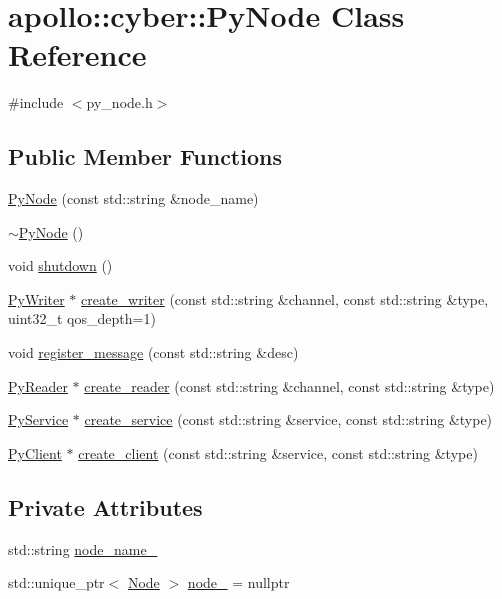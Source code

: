 \hypertarget{classapollo_1_1cyber_1_1PyNode}{\section{apollo\-:\-:cyber\-:\-:Py\-Node Class Reference}
\label{classapollo_1_1cyber_1_1PyNode}
}


{\ttfamily \#include $<$py\-\_\-node.\-h$>$}

\subsection*{Public Member Functions}
\begin{DoxyCompactItemize}
\item 
\hyperlink{classapollo_1_1cyber_1_1PyNode_a1fd745580dbd3402c16e2e5741057583}{Py\-Node} (const std\-::string \&node\-\_\-name)
\item 
\hyperlink{classapollo_1_1cyber_1_1PyNode_a72ef7b8357f4744c0fd5f5bd13c143f6}{$\sim$\-Py\-Node} ()
\item 
void \hyperlink{classapollo_1_1cyber_1_1PyNode_a5b9bca8bb275c76086e21113c829194e}{shutdown} ()
\item 
\hyperlink{classapollo_1_1cyber_1_1PyWriter}{Py\-Writer} $\ast$ \hyperlink{classapollo_1_1cyber_1_1PyNode_a3bcbe1170b63bb7552119540b793675c}{create\-\_\-writer} (const std\-::string \&channel, const std\-::string \&type, uint32\-\_\-t qos\-\_\-depth=1)
\item 
void \hyperlink{classapollo_1_1cyber_1_1PyNode_adb37cff1b766781878d43d4caf7fe183}{register\-\_\-message} (const std\-::string \&desc)
\item 
\hyperlink{classapollo_1_1cyber_1_1PyReader}{Py\-Reader} $\ast$ \hyperlink{classapollo_1_1cyber_1_1PyNode_a51040dbfb514b3758576677cdab32a01}{create\-\_\-reader} (const std\-::string \&channel, const std\-::string \&type)
\item 
\hyperlink{classapollo_1_1cyber_1_1PyService}{Py\-Service} $\ast$ \hyperlink{classapollo_1_1cyber_1_1PyNode_a045d1b609d47c236be36617cc033067b}{create\-\_\-service} (const std\-::string \&service, const std\-::string \&type)
\item 
\hyperlink{classapollo_1_1cyber_1_1PyClient}{Py\-Client} $\ast$ \hyperlink{classapollo_1_1cyber_1_1PyNode_a6e6275ce1059d4b6868be9996112058d}{create\-\_\-client} (const std\-::string \&service, const std\-::string \&type)
\end{DoxyCompactItemize}
\subsection*{Private Attributes}
\begin{DoxyCompactItemize}
\item 
std\-::string \hyperlink{classapollo_1_1cyber_1_1PyNode_aaabbfc592e52cc2501e2b4c9685927c9}{node\-\_\-name\-\_\-}
\item 
std\-::unique\-\_\-ptr$<$ \hyperlink{classapollo_1_1cyber_1_1Node}{Node} $>$ \hyperlink{classapollo_1_1cyber_1_1PyNode_a366c56a5a7c1d5c03a72c1ebcf246820}{node\-\_\-} = nullptr
\end{DoxyCompactItemize}


